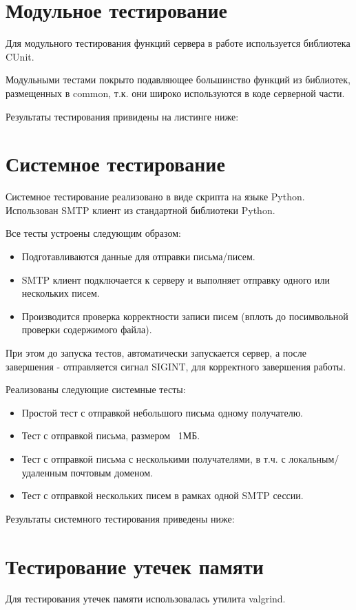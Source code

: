 \documentclass[a4paper,12pt]{report}
\begin{document}
\newpage
\section{Модульное тестирование}
Для модульного тестирования функций сервера в работе используется библиотека CUnit.

Модульными тестами покрыто подавляющее большинство функций из библиотек, размещенных в common, т.к. они широко используются в коде серверной части.

Результаты тестирования привидены на листинге ниже: 


\section{Системное тестирование}
Системное тестирование реализовано в виде скрипта на языке Python. Использован SMTP клиент из стандартной библиотеки Python. 

Все тесты устроены следующим образом: 
\begin{itemize}
	\item Подготавливаются данные для отправки письма/писем. 
	\item SMTP клиент подключается к серверу и выполняет отправку одного или нескольких писем. 
	\item Производится проверка корректности записи писем (вплоть до посимвольной проверки содержимого файла).
\end{itemize}

При этом до запуска тестов, автоматически запускается сервер, а после завершения - отправляется сигнал SIGINT, для корректного завершения работы. 

Реализованы следующие системные тесты: 
\begin{itemize}
	\item Простой тест с отправкой небольшого письма одному получателю.  
	\item Тест с отправкой письма, размером ~1МБ.  
	\item Тест с отправкой письма с несколькими получателями, в т.ч. с локальным/удаленным почтовым доменом.
	\item Тест с отправкой нескольких писем в рамках одной SMTP сессии. 
\end{itemize}

Результаты системного тестирования приведены ниже:


\section{Тестирование утечек памяти}
Для тестирования утечек памяти использовалась утилита valgrind.
\end{document}
